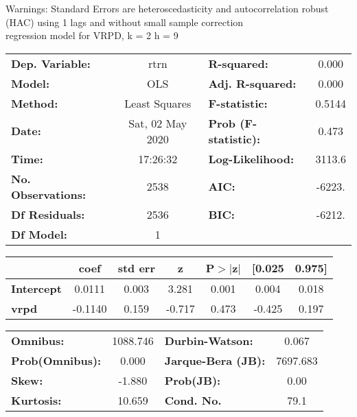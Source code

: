 Warnings: \newline
 [1] Standard Errors are heteroscedasticity and autocorrelation robust (HAC) using 1 lags and without small sample correction\\ 

regression model for VRPD, k = 2 h = 9\begin{center}
\begin{tabular}{lclc}
\toprule
\textbf{Dep. Variable:}    &       rtrn       & \textbf{  R-squared:         } &     0.000   \\
\textbf{Model:}            &       OLS        & \textbf{  Adj. R-squared:    } &     0.000   \\
\textbf{Method:}           &  Least Squares   & \textbf{  F-statistic:       } &    0.5144   \\
\textbf{Date:}             & Sat, 02 May 2020 & \textbf{  Prob (F-statistic):} &    0.473    \\
\textbf{Time:}             &     17:26:32     & \textbf{  Log-Likelihood:    } &    3113.6   \\
\textbf{No. Observations:} &        2538      & \textbf{  AIC:               } &    -6223.   \\
\textbf{Df Residuals:}     &        2536      & \textbf{  BIC:               } &    -6212.   \\
\textbf{Df Model:}         &           1      & \textbf{                     } &             \\
\bottomrule
\end{tabular}
\begin{tabular}{lcccccc}
                   & \textbf{coef} & \textbf{std err} & \textbf{z} & \textbf{P$> |$z$|$} & \textbf{[0.025} & \textbf{0.975]}  \\
\midrule
\textbf{Intercept} &       0.0111  &        0.003     &     3.281  &         0.001        &        0.004    &        0.018     \\
\textbf{vrpd}      &      -0.1140  &        0.159     &    -0.717  &         0.473        &       -0.425    &        0.197     \\
\bottomrule
\end{tabular}
\begin{tabular}{lclc}
\textbf{Omnibus:}       & 1088.746 & \textbf{  Durbin-Watson:     } &    0.067  \\
\textbf{Prob(Omnibus):} &   0.000  & \textbf{  Jarque-Bera (JB):  } & 7697.683  \\
\textbf{Skew:}          &  -1.880  & \textbf{  Prob(JB):          } &     0.00  \\
\textbf{Kurtosis:}      &  10.659  & \textbf{  Cond. No.          } &     79.1  \\
\bottomrule
\end{tabular}
\end{center}

